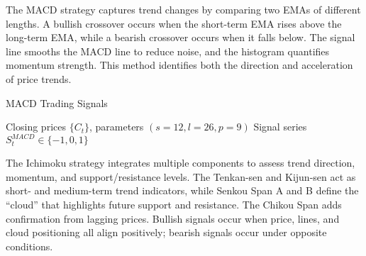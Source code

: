 The MACD strategy captures trend changes by comparing two EMAs of different lengths. A bullish crossover occurs when the short-term EMA rises above the long-term EMA, while a bearish crossover occurs when it falls below. The signal line smooths the MACD line to reduce noise, and the histogram quantifies momentum strength. This method identifies both the direction and acceleration of price trends.

\begin{breakablealgorithm}
\caption{MACD Trading Signals}
\begin{algorithmic}[1]
\Require Closing prices $\{C_t\}$, parameters $(s=12, l=26, p=9)$
\Ensure Signal series $S^{MACD}_t \in \{-1, 0, 1\}$
        \Else
        \EndIf
    \EndIf
\EndFor
{}
\end{algorithmic}
\end{breakablealgorithm}

The Ichimoku strategy integrates multiple components to assess trend direction, momentum, and support/resistance levels. The Tenkan-sen and Kijun-sen act as short- and medium-term trend indicators, while Senkou Span A and B define the “cloud” that highlights future support and resistance. The Chikou Span adds confirmation from lagging prices. Bullish signals occur when price, lines, and cloud positioning all align positively; bearish signals occur under opposite conditions.

